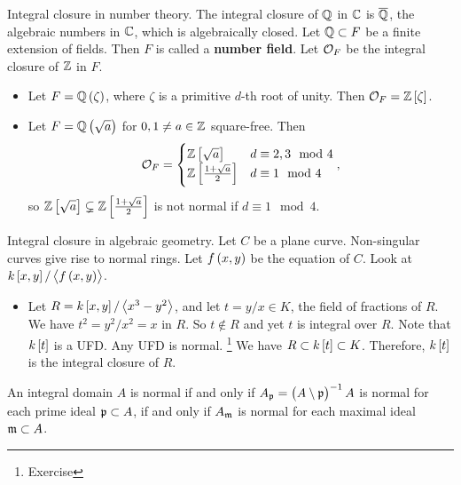 
\begin{example*}
Integral closure in number theory. The integral closure of $ \mathbb{Q} $ in $ \mathbb{C} $ is $ \overline{\mathbb{Q}} $, the algebraic numbers in $ \mathbb{C} $, which is algebraically closed. Let $ \mathbb{Q} \subset F $ be a finite extension of fields. Then $ F $ is called a \textbf{number field}. Let $ \mathcal{O}_F $ be the integral closure of $ \mathbb{Z} $ in $ F $.
\begin{itemize}
\item Let $ F = \QQ\br{\zeta} $, where $ \zeta $ is a primitive $ d $-th root of unity. Then $ \OOO_F = \ZZ\sbr{\zeta} $.
\item Let $ F = \QQ\br{\sqrt{a}} $ for $ 0, 1 \ne a \in \mathbb{Z} $ square-free. Then
$$ \OOO_F =
\begin{cases}
\ZZ\sbr{\sqrt{a}} & d \equiv 2, 3 \mod 4 \\
\ZZ\sbr{\tfrac{1 + \sqrt{a}}{2}} & d \equiv 1 \mod 4
\end{cases},
$$
so $ \ZZ\sbr{\sqrt{a}} \subsetneq \ZZ\sbr{\tfrac{1 + \sqrt{a}}{2}} $ is not normal if $ d \equiv 1 \mod 4 $.
\end{itemize}
\end{example*}

\begin{example*}
Integral closure in algebraic geometry. Let $ C $ be a plane curve. Non-singular curves give rise to normal rings. Let $ f\br{x, y} $ be the equation of $ C $. Look at $ k\sbr{x, y} / \abr{f\br{x, y}} $.
\begin{itemize}
\item Let $ R = k\sbr{x, y} / \abr{x^3 - y^2} $, and let $ t = y / x \in K $, the field of fractions of $ R $. We have $ t^2 = y^2 / x^2 = x $ in $ R $. So $ t \notin R $ and yet $ t $ is integral over $ R $. Note that $ k\sbr{t} $ is a UFD. Any UFD is normal. \footnote{Exercise} We have $ R \subset k\sbr{t} \subset K $. Therefore, $ k\sbr{t} $ is the integral closure of $ R $.
\end{itemize}
\end{example*}

\begin{proposition}
\label{prop:14.5}
An integral domain $ A $ is normal if and only if $ A_\ppp = \br{A \setminus \ppp}^{-1}A $ is normal for each prime ideal $ \mathfrak{p} \subset A $, if and only if $ A_{\mathfrak{m}} $ is normal for each maximal ideal $ \mathfrak{m} \subset A $.
\end{proposition}

